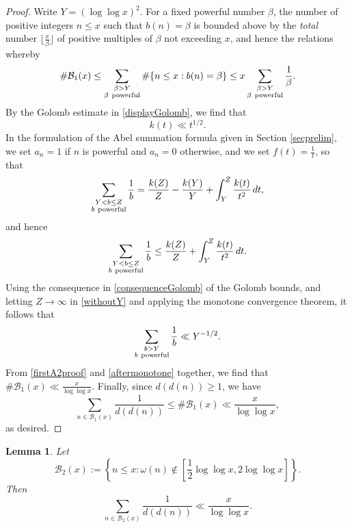\documentclass[12pt]{article}
\newtheorem{lemma}{Lemma}%
\begin{document}
\begin{proof} 
 Write $Y = (\log\log x)^2$. For a fixed powerful number $\beta$, the number of positive integers $n \leq x$ such that $b(n) = \beta$ is 
 bounded above by the \emph{total} number $\lfloor \frac{x}{\beta} \rfloor$ of positive multiples of $\beta$ not exceeding $x$, and 
 hence the relations whereby 
\begin{equation}\label{firstA2proof}
\#\mathcal{B}_1(x) \leq \sum_{\substack{\beta > Y\\ \beta \ {\rm powerful}}} \#\{n\le x : b(n) = \beta\} \leq 
 x \sum_{\substack{\beta > Y\\ \beta \ {\rm powerful}}}\frac1\beta.
\end{equation}
 By the Golomb estimate in \eqref{displayGolomb}, we find that 
\begin{equation}\label{consequenceGolomb}
k(t)\ll t^{1/2}.
\end{equation}
 In the formulation of the Abel summation formula given in Section \ref{secprelim}, we set $a_n = 1$ if $n$ is powerful and $a_n = 
 0$ otherwise, and we set $f(t) = \frac{1}{t}$, so that $$ \sum_{\substack{Y<b\le Z\\ b\ {\rm powerful}}} \frac{1}{b} = \frac{k(Z)}{Z} - 
 \frac{k(Y)}{Y} + \int_Y^Z \frac{k(t)}{t^2} \, dt, $$ and hence 
\begin{equation}\label{withoutY}
 \sum_{\substack{Y < b \leq Z\\ b\ {\rm powerful}}}\frac{1}{b} \leq \frac{k(Z)}{Z} + \int_Y^Z \frac{k(t)}{t^2}\,dt. 
\end{equation}
 Using the consequence in \eqref{consequenceGolomb} of the Golomb bounds, and letting \(Z\to\infty\) in \eqref{withoutY} and applying 
 the monotone convergence theorem, it follows that
\begin{equation}\label{aftermonotone}
 \sum_{\substack{b>Y\\ b\ {\rm powerful}}}\frac{1}{b} \ll Y^{-1/2}.
\end{equation} 
 From \eqref{firstA2proof} and \eqref{aftermonotone} together, we find that $ \#\mathcal{B}_1(x)\ll \frac{x}{\log\log x}$. Finally, since 
 $d(d(n)) \geq 1$, we have $$ \sum_{n \in \mathcal{B}_1(x)} \frac1{d(d(n))} \leq \#\mathcal{B}_1(x) \ll \frac{x}{\log\log x}, $$ as desired. 
\end{proof}

\begin{lemma}\label{LemmaB2}
Let $$ \mathcal{B}_2(x) := \left\{n \leq x:\omega(n) \notin \left[\frac12\log\log x,2\log\log x\right]\right\}. $$ Then $$ \sum_{n \in 
 \mathcal{B}_2(x)} \frac{1}{d(d(n))} \ll \frac{x}{\log\log x}. $$
\end{lemma}
\end{document}
